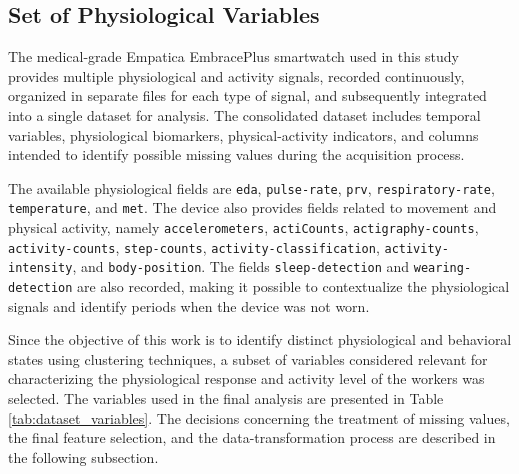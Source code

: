 \documentclass[a4paper,fleqn]{cas-sc}
\newcommand{\newtext}[1]{{\color{magenta}#1}}
\begin{document}
\subsection{Set of Physiological Variables}

The medical-grade Empatica EmbracePlus smartwatch used in this study provides multiple physiological and activity signals, recorded continuously, organized in separate files for each type of signal, and subsequently integrated into a single dataset for analysis. The consolidated dataset includes temporal variables, physiological biomarkers, physical-activity indicators, and columns intended to identify possible missing values during the acquisition process.

The available physiological fields are \texttt{eda}, \texttt{pulse-rate}, \texttt{prv}, \texttt{respiratory-rate}, \texttt{temperature}, and \texttt{met}. The device also provides fields related to movement and physical activity, namely \texttt{accelerometers}, \texttt{actiCounts}, \texttt{actigraphy-counts}, \texttt{activity-counts}, \texttt{step-counts}, \texttt{activity-classification}, \texttt{activity-intensity}, and \texttt{body-position}. The fields \texttt{sleep-detection} and \texttt{wearing-detection} are also recorded, making it possible to contextualize the physiological signals and identify periods when the device was not worn.

Since the objective of this work is to identify \newtext{distinct physiological and behavioral states} using clustering techniques, a subset of variables considered relevant for characterizing the physiological response and activity level of the workers was selected. The variables used in the final analysis are presented in Table \ref{tab:dataset_variables}. The decisions concerning the treatment of missing values, the final feature selection, and the data-transformation process are described in the following subsection.
\end{document}
